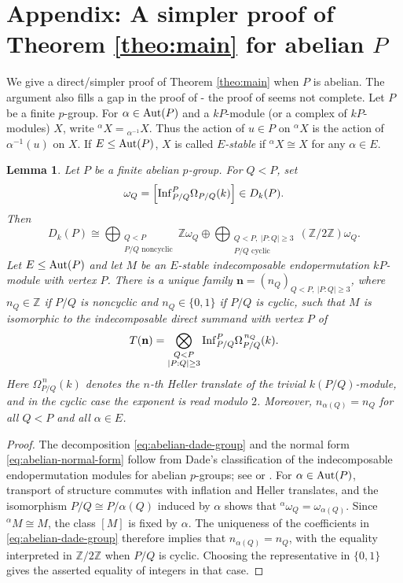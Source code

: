 \documentclass[preprint,12pt,3p]{elsarticle}
\newtheorem{lemma}[theorem]{Lemma}
\def\Inf{{\rm Inf}}
\def\Aut{{\rm Aut}}
\def\P{\mathcal{P}}
\def\Z{\mathbb{Z}}
\begin{document}
\section{Appendix: A simpler proof of Theorem \ref{theo:main} for abelian $P$}\label{s4}

We give a direct/simpler proof of Theorem \ref{theo:main} when $P$ is abelian. The argument also fills a gap in the proof of \cite[Theorem 7.11.9 (i)]{Lin18b} - the proof of \cite[Theorem 7.11.9 (i)]{Lin18b} seems not complete. Let $P$ be a finite $p$-group. For $\alpha\in\Aut(P)$ and a $kP$-module (or a complex of $kP$-modules) $X$, write ${}^\alpha X={}_{\alpha^{-1}}X$. Thus the action of $u\in P$ on ${}^\alpha X$ is the action of $\alpha^{-1}(u)$ on $X$. If $E\leq\Aut(P)$, $X$ is called {\it $E$-stable} if
${}^\alpha X\cong X$ for any $\alpha\in E$.
\begin{lemma}\label{lem:abelian-normal-form}
Let $P$ be a finite abelian $p$-group. For $Q<P$, set
$$
 \omega_Q=\left[\Inf_{P/Q}^P\Omega_{P/Q}(k)\right]\in D_k(P).
$$
Then
\begin{equation}\label{eq:abelian-dade-group}
 D_k(P)\cong\bigoplus_{\substack{Q<P\\P/Q\text{ noncyclic}}}\Z\omega_Q\oplus\bigoplus_{\substack{Q<P,\ |P:Q|\geq3\\P/Q\text{ cyclic}}}(\Z/2\Z)\omega_Q.
\end{equation}
Let $E\leq\Aut(P)$ and let $M$ be an $E$-stable indecomposable endopermutation $kP$-module with vertex $P$. There is a unique family $\mathbf n=(n_Q)_{Q<P,\ |P:Q|\geq3}$, where $n_Q\in\Z$ if $P/Q$ is noncyclic and $n_Q\in\{0,1\}$ if $P/Q$ is cyclic, such that $M$ is isomorphic to the indecomposable direct summand with vertex $P$ of
\begin{equation}\label{eq:abelian-normal-form}
 T(\mathbf n)=\bigotimes_{\substack{Q<P\\|P:Q|\geq3}}\Inf_{P/Q}^P\Omega_{P/Q}^{\,n_Q}(k).
\end{equation}
Here $\Omega_{P/Q}^{\,n}(k)$ denotes the $n$-th Heller translate of the trivial $k(P/Q)$-module, and in the cyclic case the exponent is read modulo $2$.
Moreover, $n_{\alpha(Q)}=n_Q$ for all $Q<P$ and all $\alpha\in E$.
\end{lemma}

\begin{proof}
The decomposition \eqref{eq:abelian-dade-group} and the normal form \eqref{eq:abelian-normal-form} follow from Dade's classification of the indecomposable endopermutation modules for abelian $p$-groups; see \cite[Theorem 12.5]{Dade} or \cite[Theorem 7.8.1 and the proof of Theorem 7.8.3]{Lin18b}. For $\alpha\in\Aut(P)$, transport of structure commutes with inflation and Heller translates, and the isomorphism $P/Q\cong P/\alpha(Q)$ induced by $\alpha$ shows that ${}^\alpha\omega_Q=\omega_{\alpha(Q)}$. Since ${}^\alpha M\cong M$, the class $[M]$ is fixed by $\alpha$. The uniqueness of the coefficients in \eqref{eq:abelian-dade-group} therefore implies that $n_{\alpha(Q)}=n_Q$, with the equality interpreted in $\Z/2\Z$ when $P/Q$ is cyclic. Choosing the representative in $\{0,1\}$ gives the asserted equality of integers in that case.
\end{proof}
\end{document}
